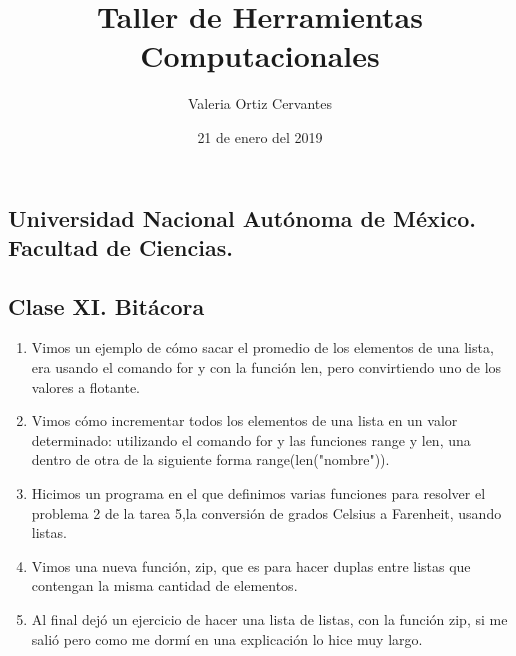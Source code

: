 \documentclass{article} %
\title{\Huge Taller de Herramientas Computacionales}
\author{Valeria Ortiz Cervantes}
\date{21 de enero del 2019}
\begin{document}
	\maketitle
	\begin{center}
		\subsection*{Universidad Nacional Autónoma de México.\\Facultad de Ciencias.\\}
	\end{center}
	\newpage
	\subsection*{Clase XI. Bitácora\\}
	\begin{enumerate}
		\item Vimos un ejemplo de cómo sacar el promedio de los elementos de una lista, era usando el comando for y con la función len, pero convirtiendo uno de los valores a flotante. 
		\item Vimos cómo incrementar todos los elementos de una lista en un valor determinado: utilizando el comando for y las funciones range y len, una dentro de otra de la siguiente forma range(len("nombre")).
		\item Hicimos un programa en el que definimos varias funciones para resolver el problema 2 de la tarea 5,la conversión de grados Celsius a Farenheit, usando listas.
		\item Vimos una nueva función, zip, que es para hacer duplas entre listas que contengan la misma cantidad de elementos.
		\item Al final dejó un ejercicio de hacer una lista de listas, con la función zip, si me salió pero como me dormí en una explicación lo hice muy largo.
	\end{enumerate}
\end{document}

